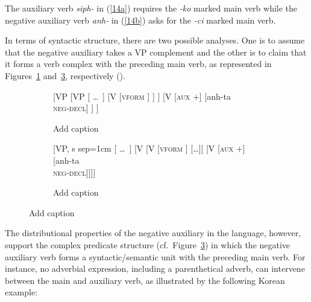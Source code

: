 \documentclass[output=paper]{langsci/langscibook}
\begin{document}
{The auxiliary verb \textit{siph-} in (\ref{14a}) requires the
\textit{-ko} marked main verb while the negative auxiliary
 verb \textit{anh-} in (\ref{14b}) asks for the \textit{-ci} marked main verb.




In terms of syntactic structure, there
are two possible analyses.  One is to assume that the negative auxiliary
takes a VP complement and the other is to claim that it forms a verb complex
with the preceding main verb, as represented in Figures~\ref{fig:3a} and~\ref{fig:3b}, respectively (\citep{Kim:16}).

\begin{figure}
	\begin{subfigure}[b]{0.48\textwidth}
\centering
		\begin{forest}
			[VP
				[VP
					[ \dots\ ] 
					[V {[\textsc{vform} ]}
					]
					]
				[V {[\textsc{aux $+$}]}
					[anh-ta\\ \textsc{neg-decl}]
				]
			]	
		\end{forest}
	\caption{Add caption}\label{fig:3a}
		\end{subfigure}	
\hfill
	\begin{subfigure}[b]{0.48\textwidth}
\centering
		\begin{forest}
			[VP, s sep=1cm
				[ \dots\ ]
				[V
					[V {[\textsc{vform} \type{ci}]}
						[\dots]]
					[V {[\textsc{aux $+$}]}
						[anh-ta\\ \textsc{neg-decl}]]]]
		\end{forest}
	\caption{Add caption}\label{fig:3b}	
		\end{subfigure}
	\caption{Add caption}
\end{figure}

The distributional properties of the negative auxiliary in the language, however, support
 the complex predicate structure (cf.\ Figure~\ref{fig:3b}) in which the negative auxiliary verb
forms a syntactic/semantic unit with the preceding main verb.
For instance, no adverbial expression, including
a parenthetical adverb, can intervene between
the main and auxiliary verb, as illustrated by the
following Korean example:

}
\end{document}
